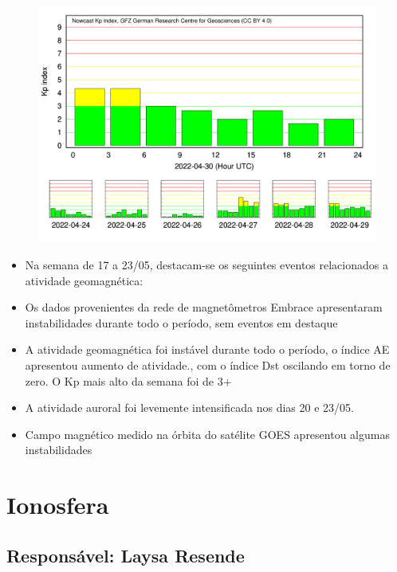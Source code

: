\documentclass[a4paper, 10pt]{article}
\begin{document}
                     \begin{figure}[H]
    
                        \centering
   
                             \includegraphics[width=14cm]{./figures//figureGeomag_7.png}

                        \end{figure}

                     \begin{itemize} 
\item Na semana de 17 a 23/05, destacam-se os seguintes eventos relacionados a atividade geomagnética:
\item Os dados provenientes da rede de magnetômetros Embrace apresentaram instabilidades durante todo o período, sem eventos em destaque
\item A atividade geomagnética foi instável durante todo o período, o índice AE apresentou aumento de atividade., com o índice Dst oscilando em torno de zero. O Kp mais alto da semana foi de 3+
\item  A atividade auroral foi levemente intensificada nos dias 20 e 23/05.
\item Campo magnético medido na órbita do satélite GOES apresentou algumas instabilidades
\end{itemize} 
\section{Ionosfera} 
 \subsection{Responsável: Laysa Resende} 
 
\end{document}
